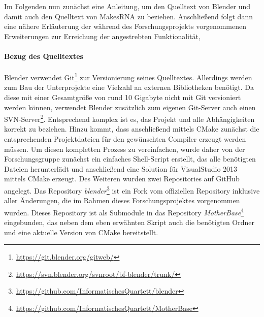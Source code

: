 Im Folgenden nun zunächst eine Anleitung, um den Quelltext von Blender und damit auch den Quelltext von MakesRNA zu beziehen. Anschließend folgt dann eine nähere Erläuterung der während des Forschungsprojekts vorgenommenen Erweiterungen zur Erreichung der angestrebten Funktionalität,

\paragraph{Bezug des Quelltextes}
\label{sec:buildblender}

Blender verwendet Git\footnote{\url{https://git.blender.org/gitweb/}} zur Versionierung seines Quelltextes. Allerdings werden zum Bau der Unterprojekte eine Vielzahl an externen Bibliotheken benötigt. Da diese mit einer Gesamtgröße von rund 10 Gigabyte nicht mit Git versioniert werden können, verwendet Blender zusätzlich zum eigenen Git-Server auch einen SVN-Server\footnote{\url{https://svn.blender.org/svnroot/bf-blender/trunk/}}. Entsprechend komplex ist es, das Projekt und alle Abhängigkeiten korrekt zu beziehen. Hinzu kommt, dass anschließend mittels CMake zunächst die entsprechenden Projektdateien für den gewünschten Compiler erzeugt werden müssen. Um diesen kompletten Prozess zu vereinfachen, wurde daher von der Forschungsgruppe zunächst ein einfaches Shell-Script erstellt, das alle benötigten Dateien herunterlädt und anschließend eine Solution für VisualStudio 2013 mittels CMake erzeugt. Des Weiteren wurden zwei Repositories auf GitHub angelegt. Das Repository \emph{blender}\footnote{\url{https://github.com/InformatischesQuartett/blender}} ist ein Fork vom offiziellen Repository inklusive aller Änderungen, die im Rahmen dieses Forschungsprojektes vorgenommen wurden. Dieses Repository ist als Submodule in das Repository \emph{MotherBase}\footnote{\url{https://github.com/InformatischesQuartett/MotherBase}} eingebunden, das neben dem eben erwähnten Skript auch die benötigten Ordner und eine aktuelle Version von CMake bereitstellt.

